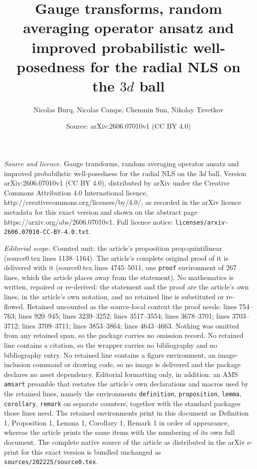\documentclass[10pt,a4paper]{amsart}
\title{Gauge transforms, random averaging operator ansatz and improved probabilistic well-posedness for the radial NLS on the $3d$ ball}
\author{Nicolas Burq, Nicolas Camps, Chenmin Sun, Nikolay Tzvetkov}
\date{Source: arXiv:2606.07010v1 (CC BY 4.0)}
\begin{document}
\maketitle

\noindent\emph{Source and licence.} Gauge transforms, random averaging operator ansatz and improved probabilistic well-posedness for the radial NLS on the $3d$ ball. Version arXiv:2606.07010v1 (CC BY 4.0), distributed by arXiv under the Creative Commons Attribution 4.0 International licence, http://creativecommons.org/licenses/by/4.0/, as recorded in the arXiv licence metadata for this exact version and shown on the abstract page https://arxiv.org/abs/2606.07010v1. Full licence notice: \texttt{licenses/arxiv-2606.07010-CC-BY-4.0.txt}.\par\smallskip

\noindent\textit{Editorial scope.} Counted unit: the article's proposition prop:quintilinear (source0.tex lines 1138--1164). The article's complete original proof of it is delivered with it (source0.tex lines 4745--5011, one \texttt{proof} environment of 267 lines, which the article places away from the statement). No mathematics is written, repaired or re-derived: the statement and the proof are the article's own lines, in the article's own notation, and no retained line is substituted or re-flowed.  Retained uncounted as the source-local context the proof needs: lines 754--763; lines 920--945; lines 3239--3252; lines 3517--3554; lines 3678--3701; lines 3703--3712; lines 3709--3711; lines 3853--3864; lines 4643--4663.  Nothing was omitted from any retained span, so the package carries no omission record.  No retained line contains a citation, so the wrapper carries no bibliography and no bibliography entry.  No retained line contains a figure environment, an image-inclusion command or drawing code, so no image is delivered and the package declares no asset dependency.  Editorial formatting only, in addition: an AMS \texttt{amsart} preamble that restates the article's own declarations and macros used by the retained lines, namely the environments \texttt{definition}, \texttt{proposition}, \texttt{lemma}, \texttt{corollary}, \texttt{remark} on separate counters, together with the standard packages those lines need.  The retained environments print in this document as Definition 1, Proposition 1, Lemma 1, Corollary 1, Remark 1 in order of appearance, whereas the article prints the same items with the numbering of its own full document.  The complete native source of the article as distributed in the arXiv e-print for this exact version is bundled unchanged as \texttt{sources/202225/source0.tex}.
\end{document}
